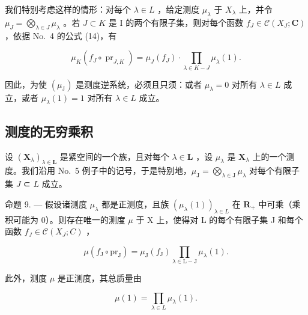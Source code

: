 我们特别考虑这样的情形：对每个 \(\lambda \in L\) ，给定测度 \(\mu_{\lambda}\) 于 \(X_{\lambda}\) 上，并令 \(\mu_{J} = \bigotimes_{\lambda \in J} \mu_{\lambda}\) 。若 \(J \subset K\) 是 I 的两个有限子集，则对每个函数 \(f_{J} \in \mathcal{C}(X_{J}; \mathbf{C})\) ，依据 No.~4 的公式 (14)，有

\[
\mu_ {K} \left(f _ {J} \circ \operatorname{pr} _ {J, K}\right) = \mu_ {J} \left(f _ {J}\right) \cdot \prod_ {\lambda \in K - J} \mu_ {\lambda} (1).\tag{17}
\]

因此，为使 \((\mu_{\mathrm{J}})\) 是测度逆系统，必须且只须：或者 \(\mu_{\lambda}=0\) 对所有 \(\lambda\in L\) 成立，或者 \(\mu_{\lambda}(1)=1\) 对所有 \(\lambda\in L\) 成立。

\subsection{测度的无穷乘积}

设 \((\mathbf{X}_{\lambda})_{\lambda \in \mathbf{L}}\) 是紧空间的一个族，且对每个 \(\lambda \in \mathbf{L}\) ，设 \(\mu_{\lambda}\) 是 \(\mathbf{X}_{\lambda}\) 上的一个测度。我们沿用 No.~5 例子中的记号，于是特别地，\(\mu_{\mathrm{J}} = \bigotimes_{\lambda \in \mathrm{J}} \mu_{\lambda}\) 对每个有限子集 \(J\) ⊂ \(L\) 成立。

命题 9. --- 假设诸测度 \(\mu_{\lambda}\) 都是正测度，且族 \((\mu_{\lambda}(1))_{\lambda \in L}\) 在 \(\mathbf{R}_{+}\) 中可乘（乘积可能为 0）。则存在唯一的测度 \(\mu\) 于 X 上，使得对 L 的每个有限子集 J 和每个函数 \(f_{J} \in \mathcal{C}(X_J; C)\) ，

\[
\mu (f _ {\mathrm{J}} \circ \mathrm{pr} _ {\mathrm{J}}) = \mu_ {\mathrm{J}} (f _ {\mathrm{J}}) \prod_ {\lambda \in \mathrm{L} - \mathrm{J}} \mu_ {\lambda} (1).\tag{18}
\]

此外，测度 \(\mu\) 是正测度，其总质量由

\[
\mu (1) = \prod_ {\lambda \in L} \mu_ {\lambda} (1).\tag{19}
\]

